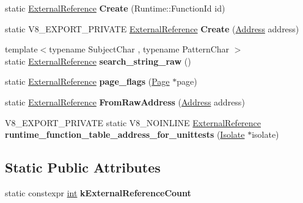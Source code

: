 \begin{DoxyCompactItemize}
static \mbox{\hyperlink{classv8_1_1internal_1_1ExternalReference}{External\+Reference}} {\bfseries Create} (Runtime\+::\+Function\+Id id)
\item 
\mbox{\label{classv8_1_1internal_1_1ExternalReference_a80e7d3ff3dd30d34dd8e5c1c0eaf15d1}} 
static V8\+\_\+\+E\+X\+P\+O\+R\+T\+\_\+\+P\+R\+I\+V\+A\+TE \mbox{\hyperlink{classv8_1_1internal_1_1ExternalReference}{External\+Reference}} {\bfseries Create} (\mbox{\hyperlink{classuintptr__t}{Address}} address)
\item 
\mbox{\label{classv8_1_1internal_1_1ExternalReference_ae4601b1de55466f38270b80ce7ec7113}} 
{\footnotesize template$<$typename Subject\+Char , typename Pattern\+Char $>$ }\\static \mbox{\hyperlink{classv8_1_1internal_1_1ExternalReference}{External\+Reference}} {\bfseries search\+\_\+string\+\_\+raw} ()
\item 
\mbox{\label{classv8_1_1internal_1_1ExternalReference_af5c06d7a276ed3ed9237a9493783df79}} 
static \mbox{\hyperlink{classv8_1_1internal_1_1ExternalReference}{External\+Reference}} {\bfseries page\+\_\+flags} (\mbox{\hyperlink{classv8_1_1internal_1_1Page}{Page}} $\ast$page)
\item 
\mbox{\label{classv8_1_1internal_1_1ExternalReference_a7203a1ac2ac49590c74c8c6fb33034ba}} 
static \mbox{\hyperlink{classv8_1_1internal_1_1ExternalReference}{External\+Reference}} {\bfseries From\+Raw\+Address} (\mbox{\hyperlink{classuintptr__t}{Address}} address)
\item 
\mbox{\label{classv8_1_1internal_1_1ExternalReference_a7d93edbe1c23f70152144231d03c52b0}} 
V8\+\_\+\+E\+X\+P\+O\+R\+T\+\_\+\+P\+R\+I\+V\+A\+TE static V8\+\_\+\+N\+O\+I\+N\+L\+I\+NE \mbox{\hyperlink{classv8_1_1internal_1_1ExternalReference}{External\+Reference}} {\bfseries runtime\+\_\+function\+\_\+table\+\_\+address\+\_\+for\+\_\+unittests} (\mbox{\hyperlink{classv8_1_1internal_1_1Isolate}{Isolate}} $\ast$isolate)
\end{DoxyCompactItemize}
\subsection*{Static Public Attributes}
\begin{DoxyCompactItemize}
\item 
static constexpr \mbox{\hyperlink{classint}{int}} {\bfseries k\+External\+Reference\+Count}
\end{DoxyCompactItemize}


